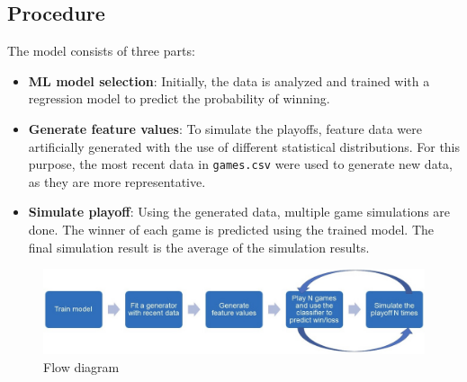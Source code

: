 \documentclass{article}
\begin{document}
\subsection{Procedure}
\label{section: Procedure}
The model consists of three parts:
\begin{itemize}
\item {\textbf{ML model selection}}: Initially, the data is analyzed and trained with a regression model to predict the probability of winning. 
\item {\textbf{Generate feature values}}: To simulate the playoffs, feature data were artificially generated with the use of different statistical distributions. For this purpose, the most recent data in \texttt{games.csv} were used to generate new data, as they are more representative.
\item {\textbf{Simulate playoff}}: Using the generated data, multiple game simulations are done. The winner of each game is predicted using the trained model. The final simulation result is the average of the simulation results.
\end{itemize}
\begin{figure}[H]
    \centering
    \includegraphics[width=\textwidth]{../plot/explain.jpeg}
    \caption{Flow diagram}
    \label{fig:modelExplain}
\end{figure}
\end{document}
